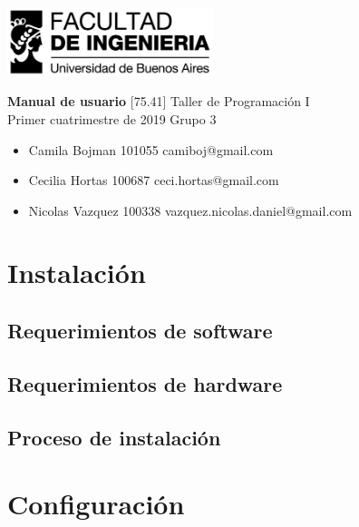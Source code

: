 \documentclass[a4paper]{article}
\newcommand{\materia}{[75.41] Taller de Programación I}
\newcommand{\trabajo}{Manual de usuario}
\newcommand{\cuatrimestre}{Primer cuatrimestre de 2019}
\newcommand{\grupo}{Grupo 3}
\begin{document}
	\setcounter{page}{1}
	
	\begin{titlepage}
		\hfill\includegraphics[width=6cm]{fiuba.jpeg}
		\begin{center}
			\vfill
			\Huge \textbf{\trabajo}
			\vskip2cm
			\Large \materia\\
			\cuatrimestre
			\vfill
			\grupo
			\begin{itemize}
				\item Camila Bojman 101055 camiboj@gmail.com
				\item Cecilia Hortas 100687 ceci.hortas@gmail.com
				\item Nicolas Vazquez 100338 vazquez.nicolas.daniel@gmail.com
			\end{itemize}
			\vskip1cm
		\end{center}
	\end{titlepage}

\section{Instalación}

\subsection{Requerimientos de software}

\subsection{Requerimientos de hardware}

\subsection{Proceso de instalación}

\section{Configuración}
\end{document}
